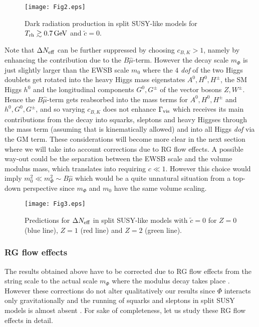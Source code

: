 \documentclass[11pt,a4paper]{article}
\begin{document}
\begin{figure}[!ht]
\begin{center}
\texttt{[image: Fig2.eps]}
\caption{Dark radiation production in split SUSY-like models for $T_{\rm rh} \gtrsim 0.7 \, {\rm GeV}$ and $\tilde{c}=0$.} 
\label{ris1}
\end{center}
\end{figure}

Note that $\Delta N_{\rm eff}$ can be further suppressed by choosing $c_{B,K} > 1$, namely by enhancing the contribution due to the $B\hat\mu$-term. However 
the decay scale $m_\Phi$ is just slightly larger than the EWSB scale $m_0$ where the $4$ \textit{dof} of the two Higgs doublets get rotated into the heavy Higgs mass eigenstates $A^0, H^0, H^\pm$, the SM Higgs $h^0$ and the longitudinal components $G^0, G^\pm$ of the vector bosons $Z, W^\pm$. Hence the $B\hat\mu$-term gets reabsorbed into the mass terms for $A^0, H^0, H^\pm$ and $h^0, G^0, G^\pm$, and so varying $c_{B,K}$ does not enhance $\Gamma_{\rm vis}$ which receives its main contributions from the decay into squarks, sleptons and heavy Higgses through the mass term (assuming that is kinematically allowed) and into all Higgs \textit{dof} via the GM term. These considerations will become more clear in the next section where we will take into account corrections due to RG flow effects. A possible way-out could be the separation between the EWSB scale and the volume modulus mass, which translates into requiring $c \ll 1$. However this choice would imply $m_0^2 \ll m_\Phi^2 \sim B\hat\mu$ which would be a quite unnatural situation from a top-down perspective since $m_\Phi$ and $m_0$ have the same volume scaling.

\begin{figure}[!ht]
\begin{center}
\texttt{[image: Fig3.eps]}
\caption{Predictions for $\Delta N_{\rm eff}$ in split SUSY-like models with $\tilde{c}=0$ for $Z = 0$ (blue line), $Z = 1$ (red line) and $Z = 2$ (green line).} 
\label{z123}
\end{center}
\end{figure}

\subsubsection*{RG flow effects}
\label{rgflows}

The results obtained above have to be corrected due to RG flow effects from the string scale to the actual scale $m_\Phi$ where the modulus decay takes place \cite{DRloop}. However these corrections do not alter qualitatively our results since $\Phi$ interacts only gravitationally and the running of squarks and sleptons in split SUSY models is almost absent \cite{Bagnaschi:2014rsa}. For sake of completeness, let us study these RG flow effects in detail. 
\end{document}
